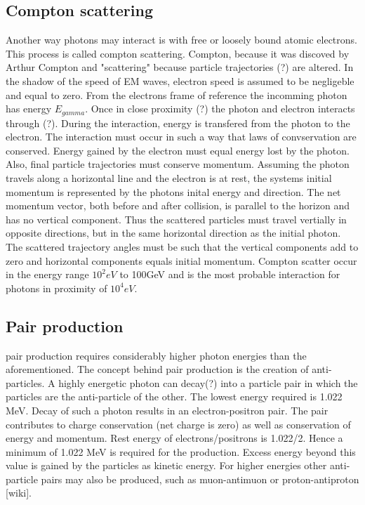 \subsection{Compton scattering}
Another way photons may interact is with free or loosely bound atomic electrons. This process is called compton scattering. Compton, because it was discoved by Arthur Compton and "scattering" because particle trajectories (?) are altered. In the shadow of the speed of EM waves, electron speed is assumed to be negligeble and equal to zero. From the electrons frame of reference the incomming photon has energy $E_{gamma}$. Once in close proximity (?) the photon and electron interacts through (?). During the interaction, energy is transfered from the photon to the electron. The interaction must occur in such a way that laws of convservation are conserved. Energy gained by the electron must equal energy lost by the photon. Also, final particle trajectories must conserve momentum. Assuming the photon travels along a horizontal line and the electron is at rest, the systems initial momentum is represented by the photons inital energy and direction. The net momentum vector, both before and after collision,  is parallel to the horizon and has no vertical component. Thus the scattered particles must travel vertially in opposite directions, but in the same horizontal direction as the initial photon. The scattered trajectory angles must be such that the vertical components add to zero and horizontal components equals initial momentum.
Compton scatter occur in the energy range $10^2eV$ to 100GeV and is the most probable interaction for photons in proximity of $10^4eV$.



\subsection{Pair production }
pair production requires considerably higher photon energies than the aforementioned. The concept behind pair production is the creation of anti-particles. A highly energetic photon can decay(?) into a particle pair in which the particles are the anti-particle of the other. The lowest energy required is 1.022 MeV. Decay of such a photon results in an electron-positron pair. The pair contributes to charge conservation (net charge is zero) as well as conservation of energy and momentum. Rest energy of electrons/positrons is 1.022/2. Hence a minimum of 1.022 MeV is required for the production. Excess energy beyond this value is gained by the particles as kinetic energy. For higher energies other anti-particle pairs may also be produced, such as muon-antimuon or proton-antiproton [wiki].

